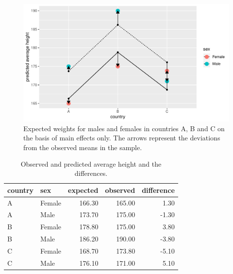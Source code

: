 \documentclass[]{book}\usepackage[]{graphicx}\usepackage[]{color}
\makeatletter
\def\maxwidth{ %
  \ifdim\Gin@nat@width>\linewidth
    \linewidth
  \else
    \Gin@nat@width
  \fi
}
\newenvironment{knitrout}{}{} %
\makeatother
\begin{document}
\begin{knitrout}
\color{fgcolor}\begin{figure}

{\centering \includegraphics[width=\maxwidth]{figure/country_sex4-1} 

}

\caption[Expected weights for males and females in countries A, B and C on the basis of main effects only]{Expected weights for males and females in countries A, B and C on the basis of main effects only. The arrows represent the deviations from the observed means in the sample.}\label{fig:country_sex4}
\end{figure}


\end{knitrout}

\begin{table}[ht]
\centering
\caption{Observed and predicted average height and the differences.} 
\label{tab:country_sex5}
\begin{tabular}{llrrr}
  \hline
country & sex & expected & observed & difference \\ 
  \hline
A & Female & 166.30 & 165.00 & 1.30 \\ 
  A & Male & 173.70 & 175.00 & -1.30 \\ 
  B & Female & 178.80 & 175.00 & 3.80 \\ 
  B & Male & 186.20 & 190.00 & -3.80 \\ 
  C & Female & 168.70 & 173.80 & -5.10 \\ 
  C & Male & 176.10 & 171.00 & 5.10 \\ 
   \hline
\end{tabular}
\end{table}
\end{document}
